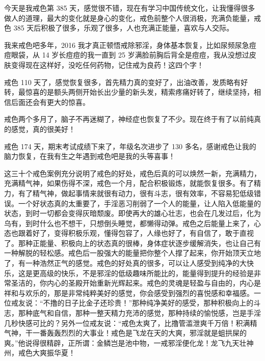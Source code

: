 \begin{case}
    今天是我戒色第 385 天，感觉很不错，现在有学习中国传统文化，让我懂得很多做人的道理，最大的变化就是身心的变化，戒色前整个人很消极，充满负能量，戒色 385 天后积极了很多，乐观了很多，人也充满正能量，喜欢与人交际。
\end{case}

\begin{case}
    我来戒色吧多年，2016 我才真正顿悟戒除邪淫，身体基本恢复，比如尿频尿急痘痘眼袋，从 14 岁长痘痘的我一直到 25 岁满脸前胸后背全是痘痘，我从没想过皮肤变得现在这样好，没吃任何药物，记住戒为良药！这四个字！
\end{case}

\begin{case}
    戒色 110 天了，感觉恢复很多，首先精力真的变好了，出油改善，发质略有好转，最惊喜的是额头两侧开始长出少量的新头发，精索疼痛好转了，继续坚持，相信后面还会有更大的惊喜。
\end{case}

\begin{case}
    戒色两个多月了，脑子不再迷糊了，神经症也恢复了不少。现在终于有了以前纯真的感觉，真的很美好！
\end{case}

\begin{case}
    戒色 174 天，期末考试成绩下来了，年级名次进步了 130 多名，感谢戒色让我的脑力恢复，在我有生之年遇到戒色吧是我的头等喜事！
\end{case}

这三十个戒色案例充分说明了戒色的好处，戒色后真的可以焕然一新，充满精力，充满精气神，如果伤得不深，戒色一个月，配合积极锻炼，就能恢复很多。有了精力，有了精气神，做起事情来就很有动力，很有斗志，很有效率，不容易犯低级错误。一个好状态真的太重要了，手淫恶习削弱了一个人的能量，让人陷入低能量的状态，到时一切都会变得灰暗颓废。即使再大的雄心壮志，也会在几发过后，化为乌有，到时什么也不想干，只想倒头睡觉，都懒得动弹。戒色之后能量上来了，心态也跟着好了，变得积极乐观，懂得包容了，人缘也好了，有自信了，敢于直视了。那种正能量、积极向上的状态真的很棒，身体症状逐步缓解消失，也让自己有一种解脱的轻松感。戒色后一股强大的能量把你整个人撑了起来，你开始顶天立地了，有一种浩然正气的感觉。戒色的好处真的很多，可以让人感受到纯净的大快乐，这是更高级的快乐，不是邪淫的低级趣味所能比的，能量得到提升的经验是非常圣洁的，你内心的圣殿开始重新光辉起来。戒色的灵魂是轻盈与自由的，内心是祥和与欢乐的，那是非常纯粹美好的感觉，你会感受到强烈的喜悦感和幸福感。一位戒友说：“不撸的日子比金子还珍贵！”那种纯净美好的感受，那种积极向上的斗志，那种底气和自信，那种一整天精力充沛的感觉，那种持续的愉悦感，岂是手淫几秒快感可比的？另外一位戒友说：“戒色太爽了，比撸管滥泄爽千万倍！积满精气神，干一番轰轰烈烈的大事业！戒色是飞龙在天的大爽，邪淫就是蛆拱屎的爽。”他说得很精辟，正所谓：金鳞岂是池中物，一戒邪淫便化龙！龙飞九天壮神州，戒色大爽振华夏！

